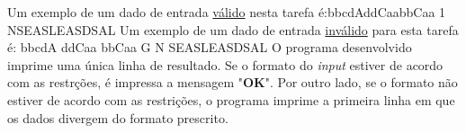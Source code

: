 \documentclass[12pt,a4paper]{article}
\begin{document}
\newpage
\textsf{Um exemplo de um dado de entrada \underline{válido} nesta tarefa é:\newline \indent \indent bbcdA\newline\indent\indent ddCaa\newline\indent\indent bbCaa\newline\indent{} 1 N\newline\indent\indent SEASLEASDSAL
\newline \indent Um exemplo de um dado de entrada \underline{inválido} para esta tarefa é: \newline\indent\indent bbcdA \newline\indent\indent ddCaa \newline\indent\indent bbCaa \newline\indent{} G N \newline\indent\indent SEASLEASDSAL}
\newline \textsf{\indent O programa desenvolvido imprime uma única linha de resultado. Se o formato do \textit{input} estiver de acordo com as restr\c{c}ões, é impressa a mensagem "\textbf{OK}". Por outro lado, se o formato não estiver de acordo com as restri\c{c}ões, o programa imprime a primeira linha em que os dados divergem do formato prescrito.}
\end{document}

